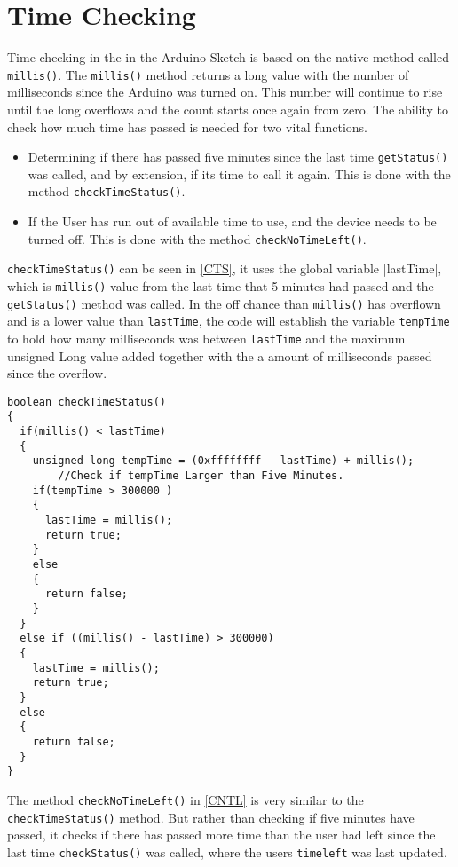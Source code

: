 \section{Time Checking}
\label{sec:timecheck}
Time checking in the in the Arduino Sketch is based on the native method called \verb|millis()|.
The \verb|millis()| method returns a long value with the number of milliseconds since the Arduino was turned on.
This number will continue to rise until the long overflows and the count starts once again from zero.\newline
The ability to check how much time has passed is needed for two vital functions.
\begin{itemize}
	\item Determining if there has passed five minutes since the last time \verb|getStatus()| was called, and by extension, if its time to call it again. This is done with the method \verb|checkTimeStatus()|.
	\item If the User has run out of available time to use, and the device needs to be turned off. This is done with the method \verb|checkNoTimeLeft()|.
\end{itemize}


\verb|checkTimeStatus()| can be seen in \autoref{CTS}, it uses the global variable |lastTime|, which is \verb|millis()| value from the last time that 5 minutes had passed and the \verb|getStatus()| method was called. In the off chance than \verb|millis()| has overflown and is a lower value than \verb|lastTime|, the code will establish the variable \verb|tempTime| to hold how many milliseconds was between \verb|lastTime| and the maximum unsigned Long value added together with the a amount of milliseconds passed since the overflow.

\begin{lstlisting}[frame=single, label=CTS, caption=Checking if five minutes has passed since the last getStatus() call.]
boolean checkTimeStatus()
{
  if(millis() < lastTime)
  {
    unsigned long tempTime = (0xffffffff - lastTime) + millis();
		//Check if tempTime Larger than Five Minutes.
    if(tempTime > 300000 )
    {      
      lastTime = millis();
      return true;
    }
    else
    {
      return false;
    }
  }
  else if ((millis() - lastTime) > 300000)
  {
    lastTime = millis();
    return true;
  }
  else
  {
    return false;  
  }  
}
\end{lstlisting}

The method \verb|checkNoTimeLeft()| in \autoref{CNTL} is very similar to the \verb|checkTimeStatus()| method. But rather than checking if five minutes have passed, it checks if there has passed more time than the user had left since the last time \verb|checkStatus()| was called, where the users \verb|timeleft| was last updated.

